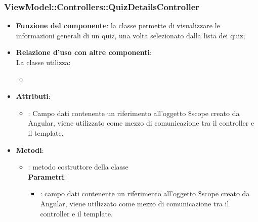\subsubsection{ViewModel::Controllers::QuizDetailsController}\begin{itemize}
\item\textbf{Funzione del componente}: la classe permette di visualizzare le informazioni generali di un quiz, una volta selezionato dalla lista dei quiz;
	\item\textbf{Relazione d'uso con altre componenti}: \\
La classe utilizza:
	\begin{itemize}
		\item
	\end{itemize}
\item\textbf{Attributi}:
	\begin{itemize}
		\item{}: Campo dati contenente un riferimento all'oggetto \$scope creato da Angular, viene utilizzato come mezzo di comunicazione tra il controller e il template.\\
	\end{itemize}
\item\textbf{Metodi}:
	\begin{itemize}
		\item{}: metodo costruttore della classe\\
		\textbf{Parametri}:
			\begin{itemize}
				\item{}: campo dati contenente un riferimento all’oggetto \$scope creato da Angular, viene utilizzato come mezzo di comunicazione tra il controller e il template.\\
			\end{itemize}
	\end{itemize}
\end{itemize}

